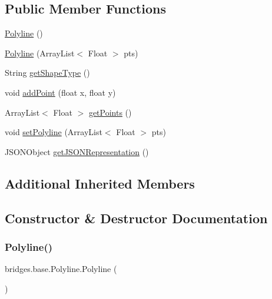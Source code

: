 \subsection*{Public Member Functions}
\begin{DoxyCompactItemize}
\item 
\hyperlink{classbridges_1_1base_1_1_polyline_a8842a3d3737dfa5b26424a05dc965a4b}{Polyline} ()
\item 
\hyperlink{classbridges_1_1base_1_1_polyline_a11d14fddddd6e89e0902e94aa1bac875}{Polyline} (Array\+List$<$ Float $>$ pts)
\item 
String \hyperlink{classbridges_1_1base_1_1_polyline_a75a5dceac8fe1f1266a676467db10aea}{get\+Shape\+Type} ()
\item 
void \hyperlink{classbridges_1_1base_1_1_polyline_a24b99307181f1a938ea408355984d191}{add\+Point} (float x, float y)
\item 
Array\+List$<$ Float $>$ \hyperlink{classbridges_1_1base_1_1_polyline_ae610d680975558db90a06949991583f8}{get\+Points} ()
\item 
void \hyperlink{classbridges_1_1base_1_1_polyline_a3fec0c95e9f26b173cba105bd39e9df1}{set\+Polyline} (Array\+List$<$ Float $>$ pts)
\item 
J\+S\+O\+N\+Object \hyperlink{classbridges_1_1base_1_1_polyline_a4ac266909645f8db9b7fcc4836f6069a}{get\+J\+S\+O\+N\+Representation} ()
\end{DoxyCompactItemize}
\subsection*{Additional Inherited Members}


\subsection{Constructor \& Destructor Documentation}
\mbox{\label{classbridges_1_1base_1_1_polyline_a8842a3d3737dfa5b26424a05dc965a4b}} 
\subsubsection{\texorpdfstring{Polyline()}{Polyline()}\hspace{0.1cm}{\footnotesize\ttfamily [1/2]}}
{\footnotesize\ttfamily bridges.\+base.\+Polyline.\+Polyline (\begin{DoxyParamCaption}{ }\end{DoxyParamCaption})}

